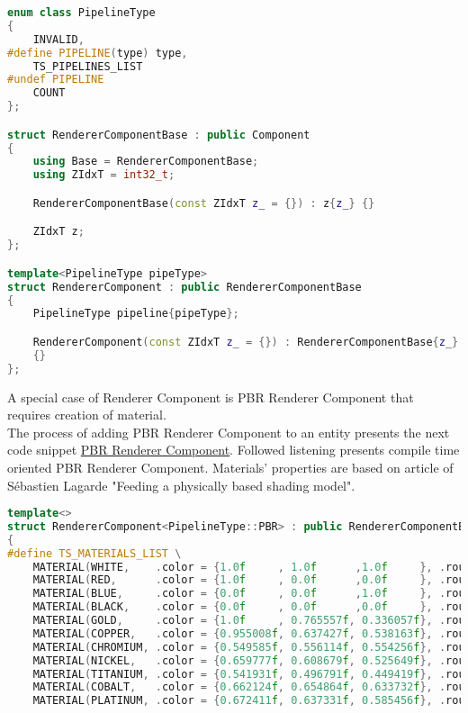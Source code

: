 \begin{itemize}
\begin{lstlisting}[language=c++, caption=Renderer Component struct (./engine/include/tsengine/ecs/components/renderer\_component.h)]
enum class PipelineType
{
    INVALID,
#define PIPELINE(type) type, 
    TS_PIPELINES_LIST
#undef PIPELINE
    COUNT
};

struct RendererComponentBase : public Component
{
    using Base = RendererComponentBase;
    using ZIdxT = int32_t;

    RendererComponentBase(const ZIdxT z_ = {}) : z{z_} {}

    ZIdxT z;
};

template<PipelineType pipeType>
struct RendererComponent : public RendererComponentBase 
{
    PipelineType pipeline{pipeType};

    RendererComponent(const ZIdxT z_ = {}) : RendererComponentBase{z_}
    {}
};
\end{lstlisting}

A special case of Renderer Component is PBR Renderer Component that requires creation of material.\\
The process of adding PBR Renderer Component to an entity presents the next code snippet \hyperref[lst:renderer_component_pbr]{PBR Renderer Component}.
Followed listening presents compile time oriented PBR Renderer Component. Materials' properties are based on article of Sébastien Lagarde "Feeding a physically based shading model".\cite{feedingpbr}
\begin{lstlisting}[language=c++, caption=Renderer PBR Component struct (./engine/include/tsengine/ecs/components/renderer\_component.h)]
template<>
struct RendererComponent<PipelineType::PBR> : public RendererComponentBase
{
#define TS_MATERIALS_LIST \
    MATERIAL(WHITE,    .color = {1.0f     , 1.0f      ,1.0f     }, .roughness = 0.5f, .metallic = 1.0f) \
    MATERIAL(RED,      .color = {1.0f     , 0.0f      ,0.0f     }, .roughness = 0.5f, .metallic = 1.0f) \
    MATERIAL(BLUE,     .color = {0.0f     , 0.0f      ,1.0f     }, .roughness = 0.5f, .metallic = 1.0f) \
    MATERIAL(BLACK,    .color = {0.0f     , 0.0f      ,0.0f     }, .roughness = 0.5f, .metallic = 1.0f) \
    MATERIAL(GOLD,     .color = {1.0f     , 0.765557f, 0.336057f}, .roughness = 0.5f, .metallic = 1.0f) \
    MATERIAL(COPPER,   .color = {0.955008f, 0.637427f, 0.538163f}, .roughness = 0.5f, .metallic = 1.0f) \
    MATERIAL(CHROMIUM, .color = {0.549585f, 0.556114f, 0.554256f}, .roughness = 0.5f, .metallic = 1.0f) \
    MATERIAL(NICKEL,   .color = {0.659777f, 0.608679f, 0.525649f}, .roughness = 0.5f, .metallic = 1.0f) \
    MATERIAL(TITANIUM, .color = {0.541931f, 0.496791f, 0.449419f}, .roughness = 0.5f, .metallic = 1.0f) \
    MATERIAL(COBALT,   .color = {0.662124f, 0.654864f, 0.633732f}, .roughness = 0.5f, .metallic = 1.0f) \
    MATERIAL(PLATINUM, .color = {0.672411f, 0.637331f, 0.585456f}, .roughness = 0.5f, .metallic = 1.0f) \


\end{lstlisting}
\end{itemize}
